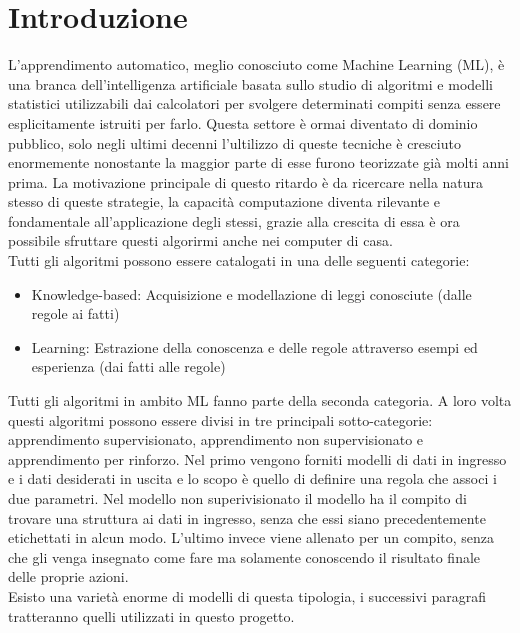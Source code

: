 \documentclass[%
    corpo=12pt,
    twoside,
    oldstyle,
    autoretitolo,
    greek,
    evenboxes,
]{toptesi}
\begin{document}
\section{Introduzione}
L'apprendimento automatico, meglio conosciuto come Machine Learning (ML), è una branca dell'intelligenza artificiale basata sullo studio di algoritmi e modelli statistici utilizzabili dai calcolatori per svolgere determinati compiti senza essere esplicitamente istruiti per farlo. Questa settore è ormai diventato di dominio pubblico, solo negli ultimi decenni l'ultilizzo di queste tecniche è cresciuto enormemente nonostante la maggior parte di esse furono teorizzate già molti anni prima. La motivazione principale di questo ritardo è da ricercare nella natura stesso di queste strategie, la capacità computazione diventa rilevante e fondamentale all'applicazione degli stessi, grazie alla crescita di essa è ora possibile sfruttare questi algorirmi anche nei computer di casa.\\
Tutti gli algoritmi possono essere catalogati in una delle seguenti categorie:
\begin{itemize}
  \item Knowledge-based: Acquisizione e modellazione di leggi conosciute (dalle regole ai fatti)
  \item Learning: Estrazione della conoscenza e delle regole attraverso esempi ed esperienza (dai fatti alle regole)
\end{itemize}
Tutti gli algoritmi in ambito ML fanno parte della seconda categoria. A loro volta questi algoritmi possono essere divisi in tre principali sotto-categorie: apprendimento supervisionato, apprendimento non supervisionato e apprendimento per rinforzo. Nel primo vengono forniti modelli di dati in ingresso e i dati desiderati in uscita e lo scopo è quello di definire una regola che associ i due parametri. Nel modello non superivisionato il modello ha il compito di trovare una struttura ai dati in ingresso, senza che essi siano precedentemente etichettati in alcun modo. L'ultimo invece viene allenato per un compito, senza che gli venga insegnato come fare ma solamente conoscendo il risultato finale delle proprie azioni.\\
Esisto una varietà enorme di modelli di questa tipologia, i successivi paragrafi tratteranno quelli utilizzati in questo progetto.
\end{document}
